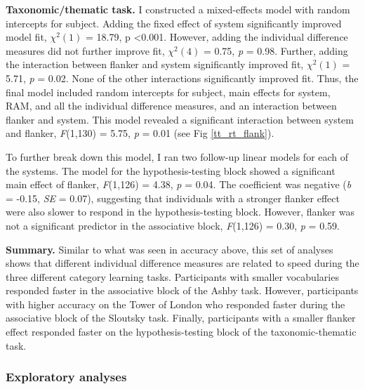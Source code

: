 \documentclass[../dissertation.tex]{subfiles}
\begin{document}
\textbf{Taxonomic/thematic task.}  I constructed a mixed-effects model with random intercepts for subject. Adding the fixed effect of system significantly improved model fit,  $\chi^{2}(1)$ = 18.79, p \textless 0.001. However, adding the individual difference measures did not further improve fit,  $\chi^{2}(4)$ = 0.75, \textit{p} = 0.98. Further, adding the interaction between flanker and system significantly improved fit, $\chi^{2}(1)$ = 5.71, \textit{p} = 0.02. None of the other interactions significantly improved fit. Thus, the final model included random intercepts for subject, main effects for system, RAM, and all the individual difference measures, and an interaction between flanker and system. This model revealed a significant interaction between system and flanker, \textit{F}(1,130) = 5.75, \textit{p} = 0.01 (see Fig \ref{tt_rt_flank}). \par 
	To further break down this model, I ran two follow-up linear models for each of the systems. The model for the hypothesis-testing block showed a significant main effect of flanker, \textit{F}(1,126) = 4.38, \textit{p} = 0.04. The coefficient was negative (\textit{b} = -0.15, \textit{SE} = 0.07), suggesting that individuals with a stronger flanker effect were also slower to respond in the hypothesis-testing block. However, flanker was not a significant predictor in the associative block, \textit{F}(1,126) = 0.30, \textit{p} = 0.59.  \par
\textbf{Summary.} Similar to what was seen in accuracy above, this set of analyses shows that different individual difference measures are related to speed during the three different category learning tasks. Participants with smaller vocabularies responded faster in the associative block of the Ashby task. However, participants with higher accuracy on the Tower of London who responded faster during the associative block of the Sloutsky task. Finally, participants with a smaller flanker effect responded faster on the hypothesis-testing block of the taxonomic-thematic task.

\subsubsection{Exploratory analyses}
\end{document}
